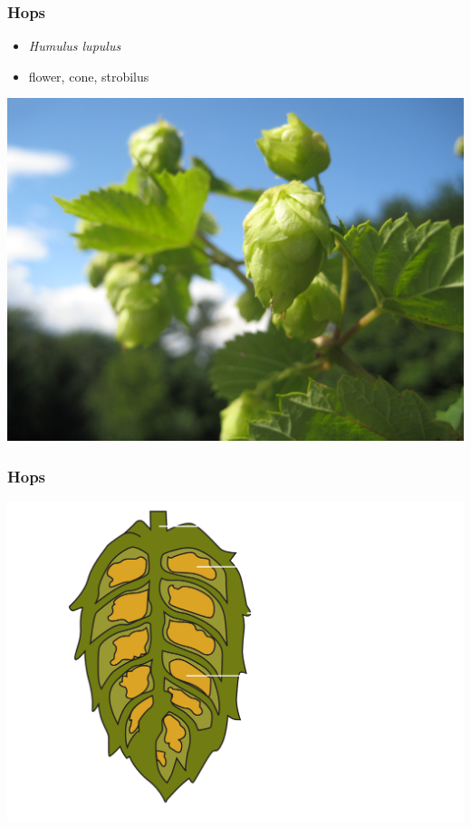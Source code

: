 \documentclass{beamer}
\begin{document}
\begin{frame}\frametitle{Hops}
\begin{itemize}
\item \textit{Humulus lupulus}
\item flower, cone, strobilus
\end{itemize}
\includegraphics[width=.6\linewidth]{./brewing/hops/Cascadehopsinthesun.jpg}
\hspace{5mm}
\end{frame}


\begin{frame}\frametitle{Hops}
\centering\includegraphics[width=\linewidth]{./brewing/hops/Cross-section-dark.pdf}
\end{frame}
\end{document}
